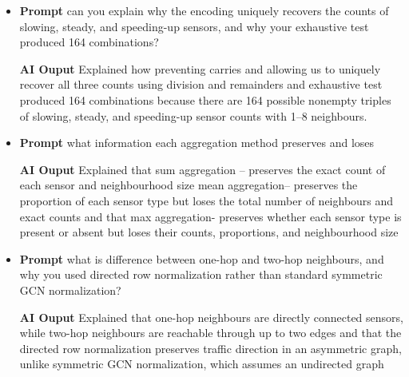 \documentclass[11pt,a4paper]{article}
\begin{document}
\begin{itemize}
	\item \textbf{Prompt} can you explain why the encoding uniquely recovers the counts of slowing, steady, and speeding-up sensors, and why your exhaustive test produced 164 combinations? 
	
	 \textbf{AI Ouput}  Explained how preventing carries and allowing us to uniquely recover all three counts using division and remainders and exhaustive test produced 164 combinations because there are 164 possible nonempty triples of slowing, steady, and speeding-up sensor counts with 1–8 neighbours. 
	
	\item \textbf{Prompt} what information each aggregation method preserves and loses
	
	 \textbf{AI Ouput} Explained that sum aggregation --  preserves the exact count of each sensor and neighbourhood size mean aggregation-- preserves the proportion of each sensor type but loses the total number of neighbours and exact counts and that max aggregation- preserves whether each sensor type is present or absent but loses their counts, proportions, and neighbourhood size
	
	\item \textbf{Prompt} what is difference between one-hop and two-hop neighbours, and why you used directed row normalization rather than standard symmetric GCN normalization? 
	
	 \textbf{AI Ouput} Explained that one-hop neighbours are directly connected sensors, while two-hop neighbours are reachable through up to two edges and that the directed row normalization preserves traffic direction in an asymmetric graph, unlike symmetric GCN normalization, which assumes an undirected graph

\end{itemize}
\end{document}
